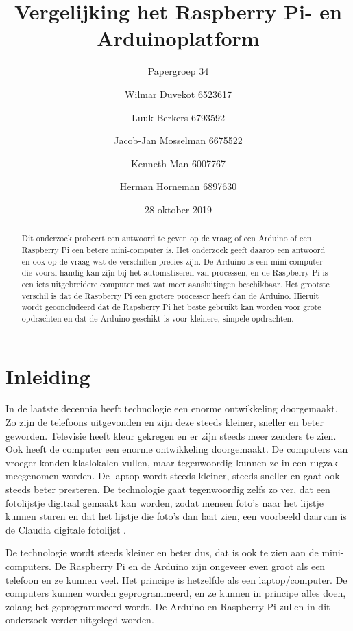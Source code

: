 \documentclass[a4paper, dutch]{scrartcl}
\title{Vergelijking het Raspberry Pi- en Arduinoplatform}
\subtitle{Papergroep 34}
\author{
    Wilmar Duvekot 6523617 \and Luuk Berkers 6793592 \and Jacob-Jan Mosselman
    6675522 \and Kenneth Man 6007767 \and Herman Horneman 6897630
}
\date{28 oktober 2019}
\begin{document}
\maketitle

\begin{abstract}
    Dit onderzoek probeert een antwoord te geven op de vraag of een Arduino of een Raspberry Pi een
    betere mini-computer is.
    Het onderzoek geeft daarop een antwoord en ook op de vraag wat de verschillen precies zijn.
    De Arduino is een mini-computer die vooral handig kan zijn bij het automatiseren van processen,
    en de Raspberry Pi is een iets uitgebreidere computer met wat meer aansluitingen beschikbaar.
    Het grootste verschil is dat de Raspberry Pi een grotere processor heeft dan de Arduino.
    Hieruit wordt geconcludeerd dat de Rapsberry Pi het beste gebruikt kan worden voor grote
    opdrachten en dat de Arduino geschikt is voor kleinere, simpele opdrachten.
\end{abstract}

\tableofcontents

\section{Inleiding}
In de laatste decennia heeft technologie een enorme ontwikkeling doorgemaakt.
Zo zijn de telefoons uitgevonden en zijn deze steeds kleiner, sneller en beter geworden.
Televisie heeft kleur gekregen en er zijn steeds meer zenders te zien.
Ook heeft de computer een enorme ontwikkeling doorgemaakt.
De computers van vroeger konden klaslokalen vullen, maar tegenwoordig kunnen ze in een rugzak
meegenomen worden.
De laptop wordt steeds kleiner, steeds sneller en gaat ook steeds beter presteren.
De technologie gaat tegenwoordig zelfs zo ver, dat een fotolijstje digitaal gemaakt kan worden,
zodat mensen foto's naar het lijstje kunnen sturen en dat het lijstje die foto's dan laat zien, een
voorbeeld daarvan is de Claudia digitale fotolijst \cite{innovu2019fotolijst}.

De technologie wordt steeds kleiner en beter dus, dat is ook te zien aan de mini-computers.
De Raspberry Pi \cite{raspberry2019raspberry} en de Arduino \cite{arduino2019arduino} zijn ongeveer
even groot als een telefoon en ze kunnen veel.
Het principe is hetzelfde als een laptop/computer.
De computers kunnen worden geprogrammeerd, en ze kunnen in principe alles doen, zolang het
geprogrammeerd wordt.
De Arduino en Raspberry Pi zullen in dit onderzoek verder uitgelegd worden.
\end{document}
